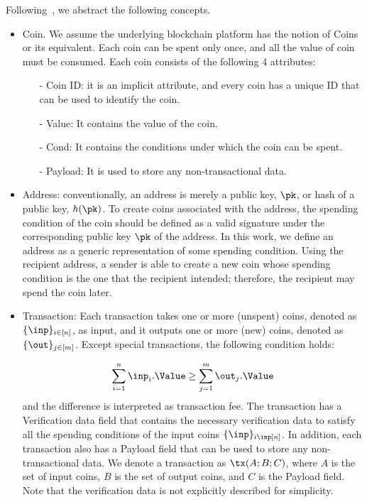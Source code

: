 Following~\cite{treasury}, we abstract the following concepts.
\begin{itemize}
	\item Coin. We assume the underlying blockchain platform has the notion of
Coins or its equivalent. Each coin can be spent only once, and all the value of
coin must be consumed. Each coin consists of the following
4 attributes:
	\begin{itemize}
		\item[-]Coin ID: it is an implicit attribute, and every coin has a unique ID that
can be used to identify the coin.
		\item[-] Value: It contains the value of the coin.
		\item[-]Cond: It contains the conditions under which the coin can be spent.
		\item[-] Payload: It is used to store any non-transactional data.
	\end{itemize}
	\item Address: conventionally, an
		address is merely a public key, $\pk$, or hash of a public key, $h(\pk)$. To create
coins associated with the address, the spending condition of the coin should be
defined as a valid signature under the corresponding public key $\pk$ of the address.
In this work, we define an address as a generic representation of some spending
condition. Using the recipient address, a sender is able to create a new coin
whose spending condition is the one that the recipient intended; therefore, the
recipient may spend the coin later.
	\item Transaction: Each transaction takes one or more (unspent) coins, denoted
		as $\{\inp\}_{i\in [n]}$, as input, and it outputs one or more (new) coins, denoted as
 $\{\out\}_{j\in [m]}$. Except special transactions, the following condition holds:

		$$\sum_{i=1}^n{\inp_i.\Value} \geq \sum_{j=1}^m {\out_j.\Value}$$
		and the difference is interpreted as transaction fee.
		The transaction has a Verification data field that contains the necessary verification data to satisfy all the spending conditions of the input coins $\{\inp\}_{i\inp[n]}$. In addition, each transaction also has a Payload field that can be used to store any non-transactional data. We denote a transaction as $\tx(A; B; C)$, where $A$ is the set
of input coins, $B$ is the set of output coins, and $C$ is the Payload field. Note that
the verification data is not explicitly described for simplicity.
\end{itemize}


